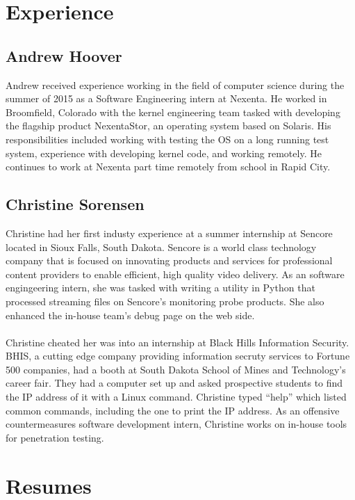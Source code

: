
\section{Experience}

\subsection{Andrew Hoover}

Andrew received experience working in the field of computer science during the summer of 2015 as a Software Engineering intern at Nexenta. He worked in Broomfield, Colorado with the kernel engineering team tasked with developing the flagship product NexentaStor, an operating system based on Solaris. His responsibilities included working with testing the OS on a long running test system, experience with developing kernel code, and working remotely. He continues to work at Nexenta part time remotely from school in Rapid City.

\subsection{Christine Sorensen}

Christine had her first industy experience at a summer internship at Sencore located in Sioux Falls, South Dakota. Sencore is a world class technology company that is focused on innovating products and services for professional content providers to enable efficient, high quality video delivery. As an software engingeering intern, she was tasked with writing a utility in Python that processed streaming files on Sencore's monitoring probe products. She also enhanced the in-house team's debug page on the web side. \\ \\
Christine cheated her was into an internship at Black Hills Information Security. BHIS, a cutting edge company providing information secruty services to Fortune 500 companies, had a booth at South Dakota School of Mines and Technology's career fair. They had a computer set up and asked prospective students to find the IP address of it with a Linux command. Christine typed ``help'' which listed common commands, including the one to print the IP address. As an offensive countermeasures software development intern, Christine works on in-house tools for penetration testing.

\section{Resumes}

